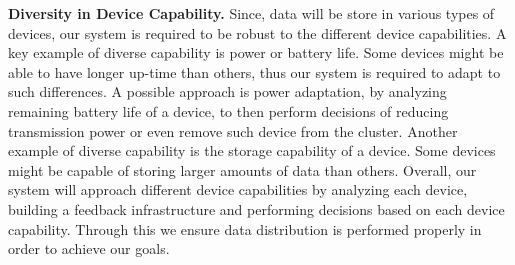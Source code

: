 \textbf{Diversity in Device Capability.}
Since, data will be store in various types of devices, our system is required to be robust to the different device capabilities. 
A key example of diverse capability is power or battery life. Some devices might be able to have longer up-time than others, thus our system is required to adapt to such differences. 
A possible approach is power adaptation, by analyzing remaining battery life of a device, to then perform decisions of reducing transmission power or even remove such device from the cluster. 
Another example of diverse capability is the storage capability of a device. Some devices might be capable of storing larger amounts of data than others. 
Overall, our system will approach different device capabilities by analyzing each device, building a feedback infrastructure and performing decisions based on each device capability. Through this we ensure data distribution is performed properly in order to achieve our goals.
% 
% 

